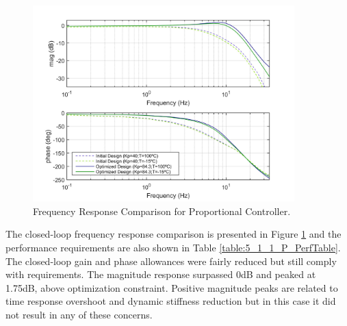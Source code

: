 \begin{figure}[H]
	\centering
	\centerline{\includegraphics[width=0.9\textwidth]{Figuras/5.OptimizationResults/5-1-1-P-FrequencyResponseComparison.jpg}}
	\caption{Frequency Response Comparison for Proportional Controller.}
	\label{fig:5_1_1_P_FreqResp}
\end{figure}

The closed-loop frequency response comparison is presented in Figure \ref{fig:5_1_1_P_FreqResp} and the performance requirements are also shown in Table \ref{table:5_1_1_P_PerfTable}. The closed-loop gain and phase allowances were fairly reduced but still comply with requirements. The magnitude response surpassed 0dB and peaked at 1.75dB, above optimization constraint. Positive magnitude peaks are related to time response overshoot and dynamic stiffness reduction but in this case it did not result in any of these concerns.

